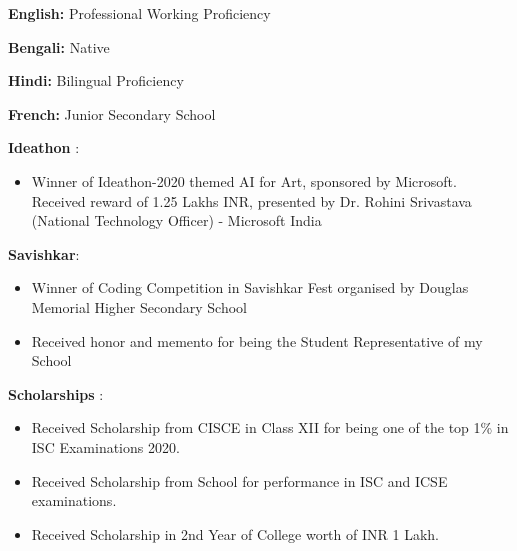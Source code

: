 \documentclass[a4paper, oneside, 12pt]{article}
\makeatletter
\def\vhrulefill#1{\leavevmode\leaders\hrule\@height#1\hfill \kern\z@}
\makeatother
\begin{document}
\begin{flushleft}
    \color{gray}{\vhrulefill{1.5pt}}
  \vspace{2mm}

  \color{black}
  \fontsize{12pt}{20pt}\selectfont
  \textbf{English:} Professional Working Proficiency

  \textbf{Bengali:} Native

  \textbf{Hindi:} Bilingual Proficiency

  \textbf{French:} Junior Secondary School

\end{flushleft}


\begin{flushleft}

    \color{gray}{\vhrulefill{1.5pt}}
  
  \vspace{2mm}
  
  \color{black}
  \textbf{Ideathon }: 
    \begin{itemize}[label =]
      \item Winner of Ideathon-2020 themed AI for Art, sponsored by Microsoft. Received reward of 1.25 Lakhs INR, presented by Dr. Rohini Srivastava (National Technology Officer) - Microsoft India
    \end{itemize}

  \textbf{Savishkar}: 
    \begin{itemize}[label =]
      \item Winner of Coding Competition in Savishkar Fest organised by Douglas Memorial Higher Secondary School
      \item Received honor and memento for being the Student Representative of my School
    \end{itemize}

  \textbf{Scholarships }: 
    \begin{itemize}[label =]
      \item Received Scholarship from CISCE in Class XII for being one of the top 1\% in ISC Examinations 2020.
      \item Received Scholarship from School for performance in ISC and ICSE examinations.
      \item Received Scholarship in 2nd Year of College worth of INR 1 Lakh.
    \end{itemize}
  
\end{flushleft}
\end{document}
